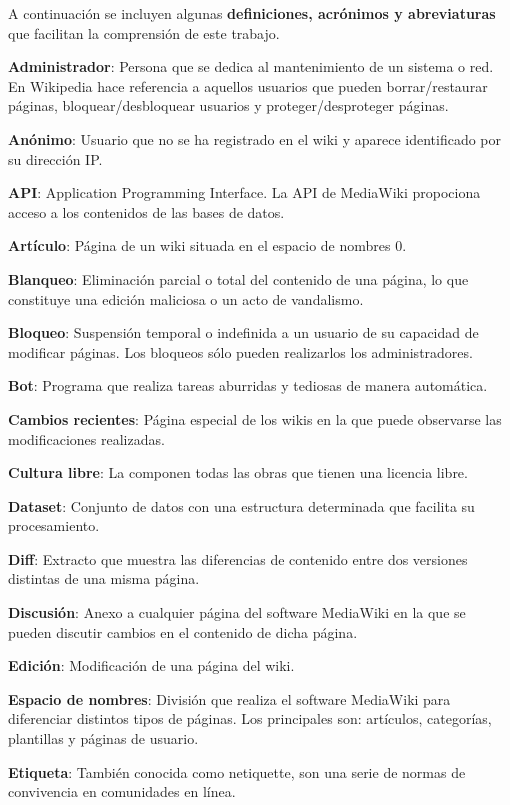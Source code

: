 \documentclass[11pt,onecolumn]{article}
\begin{document}
A continuación se incluyen algunas \textbf{definiciones, acrónimos y abreviaturas} que facilitan la comprensión de este trabajo.

\textbf{Administrador}: Persona que se dedica al mantenimiento de un sistema o red. En Wikipedia hace referencia a aquellos usuarios que pueden borrar/restaurar páginas, bloquear/desbloquear usuarios y proteger/desproteger páginas.

\textbf{Anónimo}: Usuario que no se ha registrado en el wiki y aparece identificado por su dirección IP.

\textbf{API}: Application Programming Interface. La API de MediaWiki propociona acceso a los contenidos de las bases de datos.

\textbf{Artículo}: Página de un wiki situada en el espacio de nombres 0.

\textbf{Blanqueo}: Eliminación parcial o total del contenido de una página, lo que constituye una edición maliciosa o un acto de vandalismo.

\textbf{Bloqueo}: Suspensión temporal o indefinida a un usuario de su capacidad de modificar páginas. Los bloqueos sólo pueden realizarlos los administradores.

\textbf{Bot}: Programa que realiza tareas aburridas y tediosas de manera automática.

\textbf{Cambios recientes}: Página especial de los wikis en la que puede observarse las modificaciones realizadas.

\textbf{Cultura libre}: La componen todas las obras que tienen una licencia libre.

\textbf{Dataset}: Conjunto de datos con una estructura determinada que facilita su procesamiento.

\textbf{Diff}: Extracto que muestra las diferencias de contenido entre dos versiones distintas de una misma página.

\textbf{Discusión}: Anexo a cualquier página del software MediaWiki en la que se pueden discutir cambios en el contenido de dicha página.

\textbf{Edición}: Modificación de una página del wiki.

\textbf{Espacio de nombres}: División que realiza el software MediaWiki para diferenciar distintos tipos de páginas. Los principales son: artículos, categorías, plantillas y páginas de usuario.

\textbf{Etiqueta}: También conocida como netiquette, son una serie de normas de convivencia en comunidades en línea.
\end{document}
